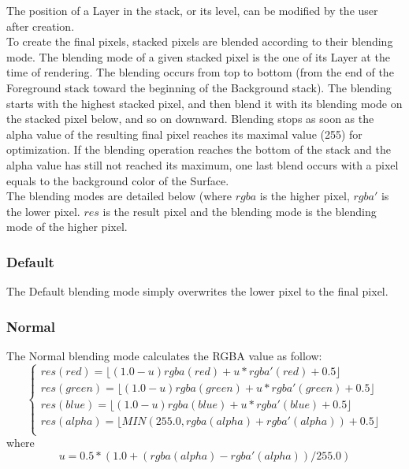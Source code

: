 The position of a Layer in the stack, or its level, can be modified by the user after creation.\\

To create the final pixels, stacked pixels are blended according to their blending mode. The blending mode of a given stacked pixel is the one of its Layer at the time of rendering. The blending occurs from top to bottom (from the end of the Foreground stack toward the beginning of the Background stack). The blending starts with the highest stacked pixel, and then blend it with its blending mode on the stacked pixel below, and so on downward. Blending stops as soon as the alpha value of the resulting final pixel reaches its maximal value (255) for optimization. If the blending operation reaches the bottom of the stack and the alpha value has still not reached its maximum, one last blend occurs with a pixel equals to the background color of the Surface.\\

The blending modes are detailed below (where $rgba$ is the higher pixel, $rgba'$ is the lower pixel. $res$ is the result pixel and the blending mode is the blending mode of the higher pixel.\\

\subsubsection{Default}

The Default blending mode simply overwrites the lower pixel to the final pixel.

\subsubsection{Normal}

The Normal blending mode calculates the RGBA value as follow:\\
\begin{equation}
\left\lbrace\begin{array}{l}
res(red)=\lfloor(1.0-u)rgba(red)+u*rgba'(red)+0.5\rfloor\\
res(green)=\lfloor(1.0-u)rgba(green)+u*rgba'(green)+0.5\rfloor\\
res(blue)=\lfloor(1.0-u)rgba(blue)+u*rgba'(blue)+0.5\rfloor\\
res(alpha)=\lfloor MIN(255.0,rgba(alpha)+rgba'(alpha))+0.5\rfloor\\
\end{array}\right.
\end{equation}
where 
\begin{equation}
u = 0.5*(1.0+(rgba(alpha)-rgba'(alpha))/255.0)
\end{equation}

